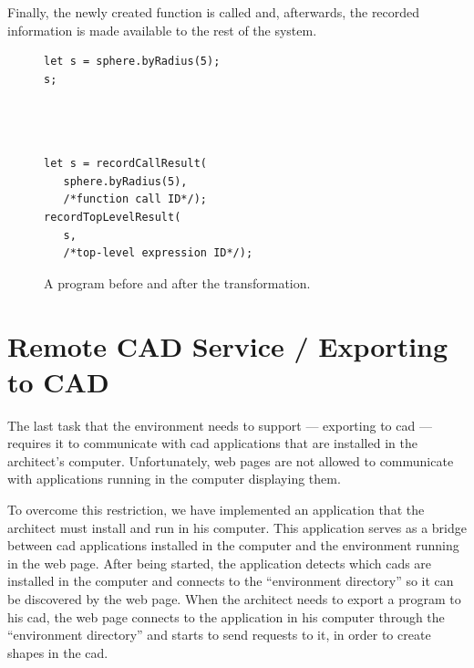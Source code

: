 Finally, the newly created function is called and, afterwards, the recorded information is made available to the rest of the system.

\begin{figure}
  \centering
\begin{minipage}[t]{0.45\linewidth}
  \begin{verbatim}
let s = sphere.byRadius(5);
s;




  \end{verbatim}
\end{minipage}
\hspace{0.05\linewidth}
\begin{minipage}[t]{0.45\linewidth}
  \begin{verbatim}
let s = recordCallResult(
   sphere.byRadius(5),
   /*function call ID*/);
recordTopLevelResult(
   s,
   /*top-level expression ID*/);
  \end{verbatim}
\end{minipage}
  \caption{A program before and after the transformation.}
  \label{fig:instrument:example}
\end{figure}




\section{Remote CAD Service / Exporting to CAD}
The last task that the environment needs to support --- exporting to \gls{cad} --- requires it to communicate with \gls{cad} applications that are installed in the architect's computer.
Unfortunately, web pages are not allowed to communicate with applications running in the computer displaying them.

To overcome this restriction, we have implemented an application that the architect must install and run in his computer.
This application serves as a bridge between \gls{cad} applications installed in the computer and the environment running in the web page.
After being started, the application detects which \glspl{cad} are installed in the computer and connects to the ``environment directory'' so it can be discovered by the web page.
When the architect needs to export a program to his \gls{cad}, the web page connects to the application in his computer through the ``environment directory'' and starts to send requests to it, in order to create shapes in the \gls{cad}.

